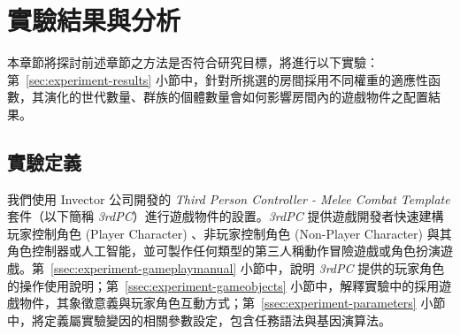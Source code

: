 \newcommand{\garesultstable}[5]{{
\begin{table}[H]
  \centering
  \caption{實驗 #1 - 共 #3 回合的最佳個體之標準化加權適應值}
  \label{tbl:result-of-experiment-#2}
  \bigskip
  \vspace{-5mm}
  \begin{minipage}[t]{0.48\linewidth}
    \begin{tabular}[t]{
      | >{\centering\arraybackslash}m{0.8cm}
      | >{\centering\arraybackslash}m{1.7cm}
      | >{\centering\arraybackslash}m{1.5cm} 
      | >{\centering\arraybackslash}m{1.0cm} | }
    \hline
    \multirow{2}{*}{回合} & 指標 & \multicolumn{1}{ c| }{適應值} & \multicolumn{1}{ c| }{權重} \\\cline{2-4}
    & \multicolumn{3}{ c| }{總適應值} \\\hline
    #4
    \end{tabular}
  \end{minipage}
  \begin{minipage}[t]{0.48\linewidth}
    \begin{tabular}[t]{
      | >{\centering\arraybackslash}m{0.8cm}
      | >{\centering\arraybackslash}m{1.7cm}
      | >{\centering\arraybackslash}m{1.5cm} 
      | >{\centering\arraybackslash}m{1.0cm} | }
    \hline
    \multirow{2}{*}{回合} & 指標 & \multicolumn{1}{ c| }{適應值} & \multicolumn{1}{ c| }{權重} \\\cline{2-4}
    & \multicolumn{3}{ c| }{總適應值} \\\hline
    #5
    \end{tabular}
  \end{minipage}
\end{table}
}}

\chapter{實驗結果與分析}
\label{cha:experiment}

本章節將探討前述章節之方法是否符合研究目標，將進行以下實驗：第~\ref{sec:experiment-results} 小節中，針對所挑選的房間採用不同權重的適應性函數，其演化的世代數量、群族的個體數量會如何影響房間內的遊戲物件之配置結果。

\section{實驗定義}
\label{sec:experiment-definition}

我們使用 Invector 公司開發的 \textit{Third Person Controller - Melee Combat Template} 套件（以下簡稱 \textit{3rdPC}）進行遊戲物件的設置。\textit{3rdPC} 提供遊戲開發者快速建構玩家控制角色 (Player Character) 、非玩家控制角色 (Non-Player Character) 與其角色控制器或人工智能，並可製作任何類型的第三人稱動作冒險遊戲或角色扮演遊戲。第~\ref{ssec:experiment-gameplaymanual} 小節中，說明 \textit{3rdPC} 提供的玩家角色的操作使用說明；第~\ref{ssec:experiment-gameobjects} 小節中，解釋實驗中的採用遊戲物件，其象徵意義與玩家角色互動方式；第~\ref{ssec:experiment-parameters} 小節中，將定義屬實驗變因的相關參數設定，包含任務語法與基因演算法。

